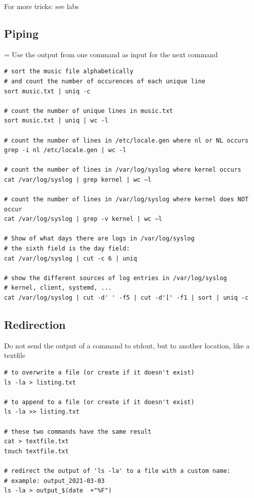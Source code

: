 \documentclass{article}
\begin{document}
For more tricks: see labs

\subsection{Piping}

= Use the output from one command as input for the next command

\begin{verbatim}
# sort the music file alphabetically
# and count the number of occurences of each unique line
sort music.txt | uniq -c

# count the number of unique lines in music.txt
sort music.txt | uniq | wc -l

# count the number of lines in /etc/locale.gen where nl or NL occurs
grep -i nl /etc/locale.gen | wc -l

# count the number of lines in /var/log/syslog where kernel occurs
cat /var/log/syslog | grep kernel | wc –l

# count the number of lines in /var/log/syslog where kernel does NOT occur
cat /var/log/syslog | grep -v kernel | wc –l

# Show of what days there are logs in /var/log/syslog
# the sixth field is the day field:
cat /var/log/syslog | cut -c 6 | uniq

# show the different sources of log entries in /var/log/syslog
# kernel, client, systemd, ...
cat /var/log/syslog | cut -d' ' -f5 | cut -d'[' -f1 | sort | uniq -c
\end{verbatim}

\subsection{Redirection}

Do not send the output of a command to stdout, but to another location, like a textfile

\begin{verbatim}
# to overwrite a file (or create if it doesn't exist)
ls -la > listing.txt

# to append to a file (or create if it doesn't exist)
ls -la >> listing.txt

# these two commands have the same result
cat > textfile.txt
touch textfile.txt

# redirect the output of 'ls -la' to a file with a custom name:
# example: output_2021-03-03
ls -la > output_$(date  +"%F")
\end{verbatim}
\end{document}
